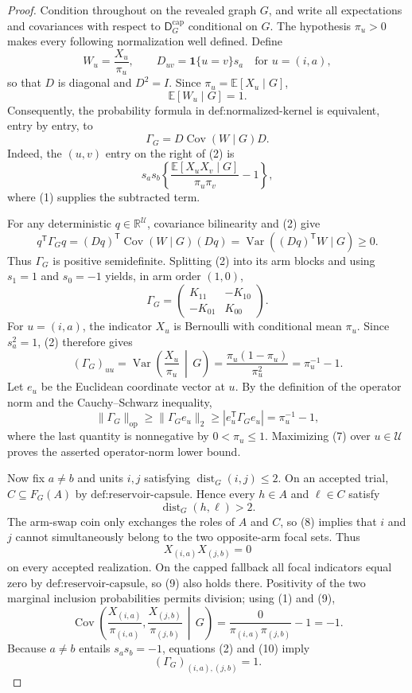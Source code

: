 \documentclass{article}
\begin{document}
\begin{proof}
Condition throughout on the revealed graph \(G\), and write all expectations and covariances with respect to \(\mathsf D_G^{\mathrm{cap}}\) conditional on \(G\).  The hypothesis \(\pi_u>0\) makes every following normalization well defined.  Define
\[
 W_u=\frac{X_u}{\pi_u},
 \qquad
 D_{uv}=\mathbf 1\{u=v\}s_a
 \quad\text{for }u=(i,a),
\]
so that \(D\) is diagonal and \(D^2=I\).  Since \(\pi_u=\mathbb E[X_u\mid G]\),
\[
 \mathbb E[W_u\mid G]=1. \tag{1}
\]
Consequently, the probability formula in \(\text{def:normalized-kernel}\) is equivalent, entry by entry, to
\[
 \Gamma_G=D\operatorname{Cov}(W\mid G)D. \tag{2}
\]
Indeed, the \((u,v)\) entry on the right of (2) is
\[
 s_as_b\left\{
 \frac{\mathbb E[X_uX_v\mid G]}{\pi_u\pi_v}-1
 \right\}, \tag{3}
\]
where (1) supplies the subtracted term.

For any deterministic \(q\in\mathbb R^{\mathcal U}\), covariance bilinearity and (2) give
\[
 q^{\mathsf T}\Gamma_Gq
 =(Dq)^{\mathsf T}\operatorname{Cov}(W\mid G)(Dq)
 =\operatorname{Var}\!\left((Dq)^{\mathsf T}W\mid G\right)
 \ge 0. \tag{4}
\]
Thus \(\Gamma_G\) is positive semidefinite.  Splitting (2) into its arm blocks and using \(s_1=1\) and \(s_0=-1\) yields, in arm order \((1,0)\),
\[
 \Gamma_G=
 \begin{pmatrix}
 K_{11}&-K_{10}\\
 -K_{01}&K_{00}
 \end{pmatrix}. \tag{5}
\]
For \(u=(i,a)\), the indicator \(X_u\) is Bernoulli with conditional mean \(\pi_u\).  Since \(s_a^2=1\), (2) therefore gives
\[
 (\Gamma_G)_{uu}
 =\operatorname{Var}\!\left(\frac{X_u}{\pi_u}\,\middle|\,G\right)
 =\frac{\pi_u(1-\pi_u)}{\pi_u^2}
 =\pi_u^{-1}-1. \tag{6}
\]
Let \(e_u\) be the Euclidean coordinate vector at \(u\).  By the definition of the operator norm and the Cauchy--Schwarz inequality,
\[
 \|\Gamma_G\|_{\mathrm{op}}
 \ge \|\Gamma_Ge_u\|_2
 \ge \left|e_u^{\mathsf T}\Gamma_Ge_u\right|
 =\pi_u^{-1}-1, \tag{7}
\]
where the last quantity is nonnegative by \(0<\pi_u\le1\).  Maximizing (7) over \(u\in\mathcal U\) proves the asserted operator-norm lower bound.

Now fix \(a\ne b\) and units \(i,j\) satisfying \(\operatorname{dist}_G(i,j)\le2\).  On an accepted trial, \(C\subseteq F_G(A)\) by \(\text{def:reservoir-capsule}\).  Hence every \(h\in A\) and \(\ell\in C\) satisfy
\[
 \operatorname{dist}_G(h,\ell)>2. \tag{8}
\]
The arm-swap coin only exchanges the roles of \(A\) and \(C\), so (8) implies that \(i\) and \(j\) cannot simultaneously belong to the two opposite-arm focal sets.  Thus
\[
 X_{(i,a)}X_{(j,b)}=0 \tag{9}
\]
on every accepted realization.  On the capped fallback all focal indicators equal zero by \(\text{def:reservoir-capsule}\), so (9) also holds there.  Positivity of the two marginal inclusion probabilities permits division; using (1) and (9),
\[
 \operatorname{Cov}\!\left(
 \frac{X_{(i,a)}}{\pi_{(i,a)}},
 \frac{X_{(j,b)}}{\pi_{(j,b)}}\,\middle|\,G
 \right)
 =\frac{0}{\pi_{(i,a)}\pi_{(j,b)}}-1
 =-1. \tag{10}
\]
Because \(a\ne b\) entails \(s_as_b=-1\), equations (2) and (10) imply
\[
 (\Gamma_G)_{(i,a),(j,b)}=1. \tag{11}
\]


\end{proof}
\end{document}
